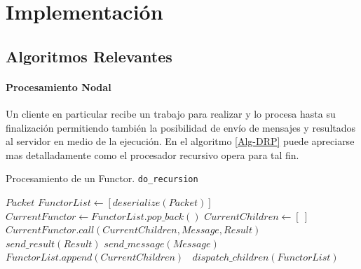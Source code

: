 \chapter{Implementación}

\section{Algoritmos Relevantes}

    \subsubsection{Procesamiento Nodal}

        Un cliente en particular recibe un trabajo para realizar y lo procesa hasta su finalización permitiendo
        también la posibilidad de envío de mensajes y resultados al servidor en medio de la ejecución. En
        el algoritmo \ref{Alg-DRP} puede apreciarse mas detalladamente como el procesador recursivo opera para
        tal fin.\\

%
%
%
%

    \renewcommand{\algorithmicrequire}{\textbf{Input:}}
    \renewcommand{\algorithmicensure}{\textbf{Output:}}

    \begin{algorithm}[!ht]
        \caption{Procesamiento de un Functor. \texttt{do\_recursion}}\label{Alg-DRP}
        \begin{algorithmic}[1]
        \REQUIRE $Packet$
        \STATE $FunctorList \gets [deserialize(Packet)]$
        \STATE $\ $
            \STATE $CurrentFunctor \gets FunctorList.pop\_back()$
            \STATE $CurrentChildren \gets [\ ]$
            \STATE $\ $
            \STATE $CurrentFunctor.call(CurrentChildren, Message, Result)$
            \STATE $\ $
                \STATE $send\_result(Result)$
            \ELSE
                    \STATE $send\_message(Message)$     
                \ENDIF
            \ENDIF
            \STATE $\ $
            \STATE $FunctorList.append(CurrentChildren)$
            \STATE $\ $
                \STATE $dispatch\_children(FunctorList)$
            \ENDIF
        \ENDWHILE

        \end{algorithmic}
    \end{algorithm}

